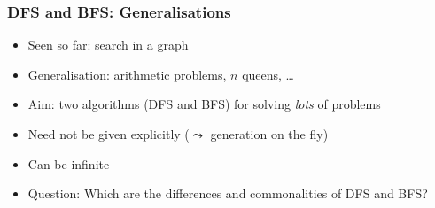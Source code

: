 \begin{frame}[fragile]\frametitle{DFS and BFS: Generalisations}

\begin{itemize}
\item Seen so far: search in a  graph
\item Generalisation: arithmetic problems, $n$ queens, \dots
\item Aim: two algorithms (DFS and BFS) for solving \emph{lots} of  problems 
\end{itemize}

\vspace{5mm}
\begin{itemize}
\item Need not be given explicitly ($\leadsto$ generation on the fly)
\item Can be infinite
\item Question: Which are the differences and commonalities of DFS and BFS?
\end{itemize}

\end{frame}

